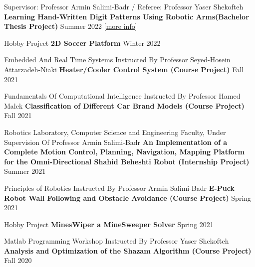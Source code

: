 \begin{cventries}
    \cventry
    {Supervisor: Professor Armin Salimi-Badr / Referee: Professor Yaser Shekofteh}
    {\textbf {Learning Hand-Written Digit Patterns Using Robotic Arms(Bachelor Thesis Project)}}
    {}
    {Summer 2022}
    {\href{https://ph504.github.io/portfolio/portfolio-1/}{\textcolor{cobalt}{[more info]}}\newline}
    \vspace{0.5 cm}
    
    \cventry
    {Hobby Project}
    {\textbf {2D Soccer Platform}}
    {}
    {Winter 2022}
    {}
    \vspace{0.5 cm}
    
    \cventry
    {Embedded And Real Time Systems Instructed By Professor Seyed-Hosein Attarzadeh-Niaki}
    {\textbf {Heater/Cooler Control System (Course Project)}}
    {}
    {Fall 2021}
    {}
    \vspace{0.5 cm}
    
      \cventry
    {Fundamentals Of Computational Intelligence Instructed By Professor Hamed Malek}
    {\textbf {Classification of Different Car Brand Models (Course Project)}}
    {}
    {Fall 2021}
    {}
    \vspace{0.5 cm}
    
     \cventry
    {Robotics Laboratory, Computer Science and Engineering Faculty, Under Supervision Of Professor Armin Salimi-Badr}
    {\textbf {An Implementation of a Complete Motion Control, Planning, Navigation, Mapping Platform for the Omni-Directional Shahid Beheshti Robot (Internship Project)}}
    {}
    {Summer 2021}
    {}
    \vspace{0.5 cm}
    
    \cventry
    {Principles of Robotics Instructed By Professor Armin Salimi-Badr}
    {\textbf {E-Puck Robot Wall Following and Obstacle Avoidance (Course Project)}}
    {}
    {Spring 2021}
    {}
    \vspace{0.5 cm}
        
    \cventry
    {Hobby Project}
    {\textbf {MinesWiper a MineSweeper Solver}}
    {}
    {Spring 2021}
    {}
    \vspace{0.5 cm}
    
    \cventry
    {Matlab Programming Workshop Instructed By Professor Yaser Shekofteh}
    {\textbf {Analysis and Optimization of the Shazam Algorithm (Course Project)}}
    {}
    {Fall 2020}
    {}
    \vspace{0.5 cm}
    

\end{cventries}

